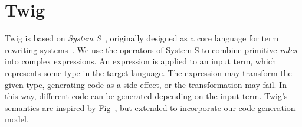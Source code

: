 
\section{Twig}
\label{sec:semantics}

Twig is based on \emph{System S}~\cite{system-s}, originally
designed as a core language for term rewriting
systems~\cite{baader98rewriting}. We use the operators of System S
to combine primitive \emph{rules} into complex expressions. An
expression is applied to an input term, which represents some type
in the target language. The expression may transform the given
type, generating code as a side effect, or the transformation may
fail. In this way, different code can be generated depending on
the input term. Twig's semantics are inspired by Fig~\cite{fig},
but extended to incorporate our code generation model.





